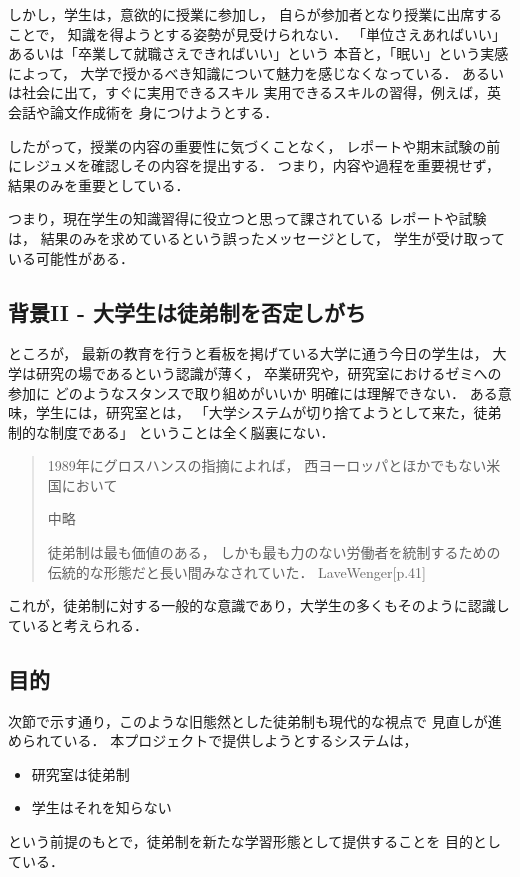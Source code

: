\documentclass{hissymp}
\begin{document}
しかし，学生は，意欲的に授業に参加し，
自らが参加者となり授業に出席することで，
知識を得ようとする姿勢が見受けられない．
「単位さえあればいい」あるいは「卒業して就職さえできればいい」という
本音と，「眠い」という実感によって，
大学で授かるべき知識について魅力を感じなくなっている．
あるいは社会に出て，すぐに実用できるスキル
実用できるスキルの習得，例えば，英会話や論文作成術を
身につけようとする．

したがって，授業の内容の重要性に気づくことなく，
レポートや期末試験の前にレジュメを確認しその内容を提出する．
つまり，内容や過程を重要視せず，結果のみを重要としている．

つまり，現在学生の知識習得に役立つと思って課されている
レポートや試験は，
結果のみを求めているという誤ったメッセージとして，
学生が受け取っている可能性がある．

\subsection{背景II - 大学生は徒弟制を否定しがち}
\label{sec:org4ae3b3e}
ところが，
最新の教育を行うと看板を掲げている大学に通う今日の学生は，
大学は研究の場であるという認識が薄く，
卒業研究や，研究室におけるゼミへの参加に
どのようなスタンスで取り組めがいいか
明確には理解できない．
ある意味，学生には，研究室とは，
「大学システムが切り捨てようとして来た，徒弟制的な制度である」
ということは全く脳裏にない．
\begin{quote}
1989年にグロスハンスの指摘によれば，
西ヨーロッパとほかでもない米国において

中略

徒弟制は最も価値のある，
しかも最も力のない労働者を統制するための伝統的な形態だと長い間みなされていた．
LaveWenger[p.41]
\end{quote}
これが，徒弟制に対する一般的な意識であり，大学生の多くもそのように認識していると考えられる．

\subsection{目的}
\label{sec:org9f8bdbb}
次節で示す通り，このような旧態然とした徒弟制も現代的な視点で
見直しが進められている．
本プロジェクトで提供しようとするシステムは，
\begin{itemize}
\item 研究室は徒弟制
\item 学生はそれを知らない
\end{itemize}
という前提のもとで，徒弟制を新たな学習形態として提供することを
目的としている．
\end{document}
